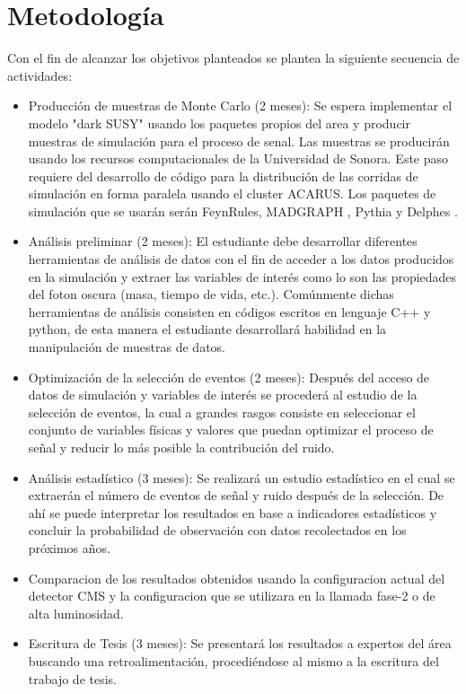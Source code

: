 \chapter{Metodología}

Con el fin de alcanzar los objetivos planteados se plantea la siguiente secuencia de actividades:


\begin{itemize}
    \item Producción de muestras de Monte Carlo (2 meses): Se espera implementar el modelo "dark SUSY" usando los paquetes propios del area y producir muestras de simulación para el proceso de senal. Las muestras se producirán usando los recursos computacionales de la Universidad de Sonora. Este paso requiere del desarrollo de código para la distribución de las corridas de simulación en forma paralela usando el cluster ACARUS. Los paquetes de simulación que se usarán serán FeynRules, MADGRAPH \cite{Alwall:2007st}, Pythia y Delphes \cite{deFavereau2014}.
    \item Análisis preliminar (2 meses): El estudiante debe desarrollar diferentes herramientas de análisis de datos con el fin de acceder a los datos producidos en la simulación y extraer las variables de interés como lo son las propiedades del foton oscura (masa, tiempo de vida, etc.). Comúnmente dichas herramientas de análisis consisten en códigos escritos en lenguaje C++ y python, de esta manera el estudiante desarrollará habilidad en la manipulación de muestras de datos.
    \item Optimización de la selección de eventos (2 meses): Después del acceso de datos de simulación y variables de interés se procederá al estudio de la selección de eventos, la cual a grandes rasgos consiste en seleccionar el conjunto de variables físicas y valores que puedan optimizar el proceso de señal y reducir lo más posible la contribución del ruido.
    \item Análisis estadístico (3 meses): Se realizará un estudio estadístico en el cual se extraerán el número de eventos de señal y ruido después de la selección. De ahí se puede interpretar los resultados en base a indicadores estadísticos y concluir la probabilidad de observación con datos recolectados en los próximos años.
    \item Comparacion de los resultados obtenidos usando la configuracion actual del detector CMS y la configuracion que se utilizara en la llamada fase-2 o de alta luminosidad. 
    \item Escritura de Tesis (3 meses): Se presentará los resultados a expertos del área buscando una retroalimentación, procediéndose al mismo a la escritura del trabajo de tesis.
\end{itemize}
